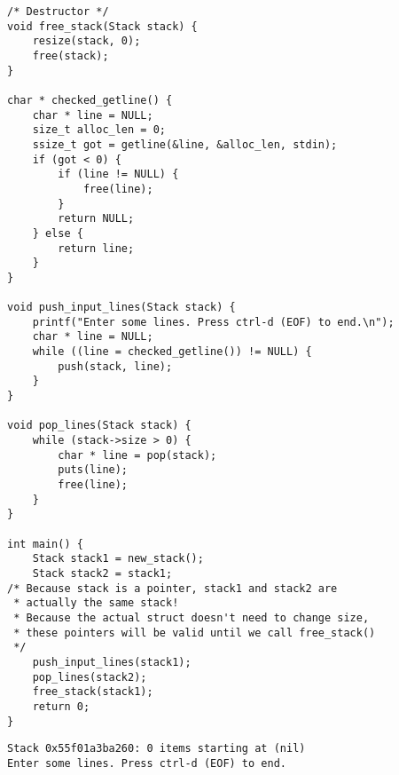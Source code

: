 \documentclass[11pt]{article}
\begin{document}
\begin{verbatim}
/* Destructor */
void free_stack(Stack stack) {
    resize(stack, 0);
    free(stack);
}

char * checked_getline() {
    char * line = NULL;
    size_t alloc_len = 0;
    ssize_t got = getline(&line, &alloc_len, stdin);
    if (got < 0) {
        if (line != NULL) {
            free(line);
        }
        return NULL;
    } else {
        return line;
    }
}

void push_input_lines(Stack stack) {
    printf("Enter some lines. Press ctrl-d (EOF) to end.\n");
    char * line = NULL;
    while ((line = checked_getline()) != NULL) {
        push(stack, line);
    }
}

void pop_lines(Stack stack) {
    while (stack->size > 0) {
        char * line = pop(stack);
        puts(line);
        free(line);
    }
}

int main() {
    Stack stack1 = new_stack();
    Stack stack2 = stack1;
/* Because stack is a pointer, stack1 and stack2 are 
 * actually the same stack!
 * Because the actual struct doesn't need to change size,
 * these pointers will be valid until we call free_stack()
 */
    push_input_lines(stack1);
    pop_lines(stack2);
    free_stack(stack1);
    return 0;
}
\end{verbatim}

\begin{verbatim}
Stack 0x55f01a3ba260: 0 items starting at (nil)
Enter some lines. Press ctrl-d (EOF) to end.
\end{verbatim}
\end{document}
